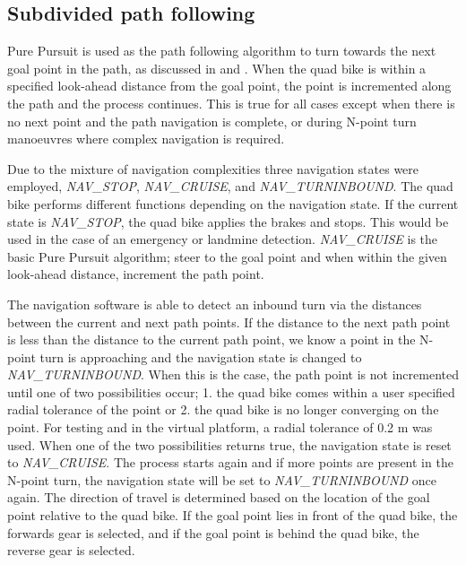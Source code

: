 \documentclass[main.tex]{subfiles}
\begin{document}
\subsection{Subdivided path following}
Pure Pursuit is used as the path following algorithm to turn towards the next goal point in the path, as discussed in  and . When the quad bike is within a specified look-ahead distance from the goal point, the point is incremented along the path and the process continues. This is true for all cases except when there is no next point and the path navigation is complete, or during N-point turn manoeuvres where complex navigation is required.

Due to the mixture of navigation complexities three navigation states were employed, \textit{NAV\_STOP}, \textit{NAV\_CRUISE}, and \textit{NAV\_TURNINBOUND}. The quad bike performs different functions depending on the navigation state. If the current state is \textit{NAV\_STOP}, the quad bike applies the brakes and stops. This would be used in the case of an emergency or landmine detection. \textit{NAV\_CRUISE} is the basic Pure Pursuit algorithm; steer to the goal point and when within the given look-ahead distance, increment the path point.

The navigation software is able to detect an inbound turn via the distances between the current and next path points. If the distance to the next path point is less than the distance to the current path point, we know a point in the N-point turn is approaching and the navigation state is changed to \textit{NAV\_TURNINBOUND}. When this is the case, the path point is not incremented until one of two possibilities occur; 1. the quad bike comes within a user specified radial tolerance of the point or 2. the quad bike is no longer converging on the point. For testing and in the virtual platform, a radial tolerance of 0.2 m was used. When one of the two possibilities returns true, the navigation state is reset to \textit{NAV\_CRUISE}. The process starts again and if more points are present in the N-point turn, the navigation state will be set to \textit{NAV\_TURNINBOUND} once again. The direction of travel is determined based on the location of the goal point relative to the quad bike. If the goal point lies in front of the quad bike, the forwards gear is selected, and if the goal point is behind the quad bike, the reverse gear is selected.
\end{document}
